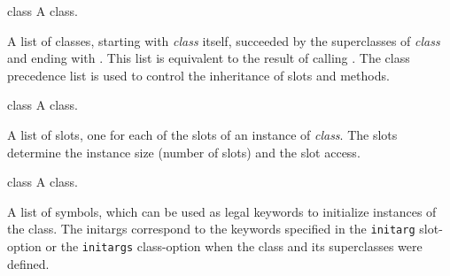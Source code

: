 \begin{optDefinition}
%
\begin{arguments}
    \item[class] A class.
\end{arguments}
%
\result%
A list of classes, starting with {\em class} itself, succeeded by the
superclasses of {\em class} and ending with . This list is
equivalent to the result of calling .
%
\remarks%
The class precedence list is used to control the inheritance of slots and
methods.

%
\begin{arguments}
    \item[class] A class.
\end{arguments}
%
\result%
A list of slots, one for each of the slots of an instance
of {\em class}.
%
\remarks%
The slots determine the instance size (number of slots)
and the slot access.

%
\begin{arguments}
    \item[class] A class.
\end{arguments}
%
\result%
A list of symbols, which can be used as legal keywords to initialize
instances of the class.
%
\remarks%
The initargs correspond to the keywords specified in the {\tt initarg}
slot-option or the {\tt initargs} class-option when the
class and its superclasses were defined.
%
\end{optDefinition}

